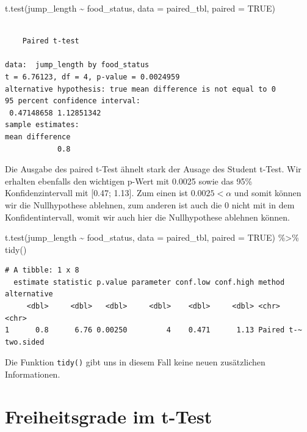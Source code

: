 \documentclass[
  letterpaper,
  DIV=11,
  oneside]{scrreport}
\newenvironment{Shaded}{\begin{snugshade}}{\end{snugshade}}
\newcommand{\AttributeTok}[1]{\textcolor[rgb]{0.40,0.45,0.13}{#1}}
\newcommand{\ConstantTok}[1]{\textcolor[rgb]{0.56,0.35,0.01}{#1}}
\newcommand{\FunctionTok}[1]{\textcolor[rgb]{0.28,0.35,0.67}{#1}}
\newcommand{\NormalTok}[1]{\textcolor[rgb]{0.00,0.23,0.31}{#1}}
\newcommand{\SpecialCharTok}[1]{\textcolor[rgb]{0.37,0.37,0.37}{#1}}
\begin{document}
\begin{Shaded}
\begin{Highlighting}[]
\FunctionTok{t.test}\NormalTok{(jump\_length }\SpecialCharTok{\textasciitilde{}}\NormalTok{ food\_status, }
       \AttributeTok{data =}\NormalTok{ paired\_tbl, }\AttributeTok{paired =} \ConstantTok{TRUE}\NormalTok{)}
\end{Highlighting}
\end{Shaded}

\begin{verbatim}

    Paired t-test

data:  jump_length by food_status
t = 6.76123, df = 4, p-value = 0.0024959
alternative hypothesis: true mean difference is not equal to 0
95 percent confidence interval:
 0.47148658 1.12851342
sample estimates:
mean difference 
            0.8 
\end{verbatim}

Die Ausgabe des paired t-Test ähnelt stark der Ausage des Student
t-Test. Wir erhalten ebenfalls den wichtigen p-Wert mit 0.0025 sowie das
95\% Konfidenzintervall mit {[}0.47; 1.13{]}. Zum einen ist
\(0.0025 < \alpha\) und somit können wir die Nullhypothese ablehnen, zum
anderen ist auch die 0 nicht mit in dem Konfidentintervall, womit wir
auch hier die Nullhypothese ablehnen können.

\begin{Shaded}
\begin{Highlighting}[]
\FunctionTok{t.test}\NormalTok{(jump\_length }\SpecialCharTok{\textasciitilde{}}\NormalTok{ food\_status, }
       \AttributeTok{data =}\NormalTok{ paired\_tbl, }\AttributeTok{paired =} \ConstantTok{TRUE}\NormalTok{) }\SpecialCharTok{\%\textgreater{}\%} 
  \FunctionTok{tidy}\NormalTok{() }
\end{Highlighting}
\end{Shaded}

\begin{verbatim}
# A tibble: 1 x 8
  estimate statistic p.value parameter conf.low conf.high method     alternative
     <dbl>     <dbl>   <dbl>     <dbl>    <dbl>     <dbl> <chr>      <chr>      
1      0.8      6.76 0.00250         4    0.471      1.13 Paired t-~ two.sided  
\end{verbatim}

Die Funktion \texttt{tidy()} gibt uns in diesem Fall keine neuen
zusätzlichen Informationen.

\hypertarget{freiheitsgrade-im-t-test}{%
\section{Freiheitsgrade im t-Test}\label{freiheitsgrade-im-t-test}}
\end{document}
